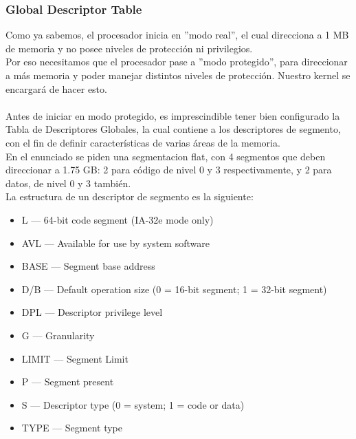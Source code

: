 \subsubsection{Global Descriptor Table}
Como ya sabemos, el procesador inicia en ''modo real'', el cual direcciona a 1 MB de memoria y no posee niveles de protecci\'on ni privilegios.\\
Por eso necesitamos que el procesador pase a ''modo protegido'', para direccionar a m\'as memoria y poder manejar distintos niveles de protecci\'on. Nuestro kernel se encargar\'a de hacer esto.\\
\\
Antes de iniciar en modo protegido, es imprescindible tener bien configurado la Tabla de Descriptores Globales, la cual contiene a los descriptores de segmento, con el fin de definir caracter\'isticas de varias \'areas de la memoria.\\
En el enunciado se piden una segmentacion flat, con 4 segmentos que deben direccionar a 1.75 GB: 2 para c\'odigo de nivel 0 y 3 respectivamente, y 2 para datos, de nivel 0 y 3 tambi\'en.\\

La estructura de un descriptor de segmento es la siguiente:\\
\begin{itemize}
  \item L — 64-bit code segment (IA-32e mode only)
  \item AVL — Available for use by system software
  \item BASE — Segment base address
  \item D/B — Default operation size (0 = 16-bit segment; 1 = 32-bit segment)
  \item DPL — Descriptor privilege level
  \item G — Granularity
  \item LIMIT — Segment Limit
  \item P — Segment present
  \item S — Descriptor type (0 = system; 1 = code or data)
  \item TYPE — Segment type
\end{itemize}

